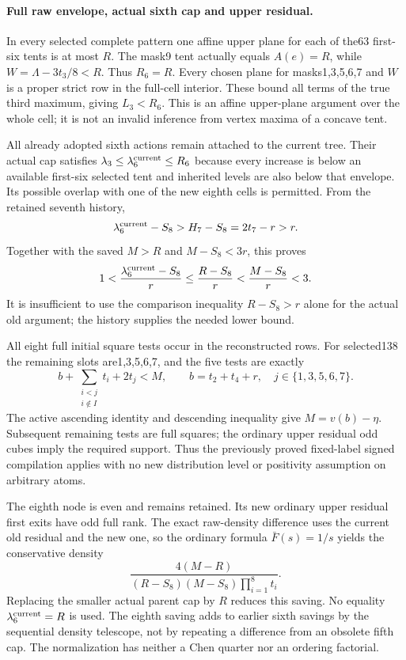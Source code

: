 \paragraph{Full raw envelope, actual sixth cap and upper residual.}
In every selected complete pattern one affine upper plane for each of
the63 first-six tents is at most $R$. The mask9 tent actually equals
$A(e)=R$, while $W=\Lambda-3t_3/8<R$. Thus $R_6=R$.
Every chosen plane for masks1,3,5,6,7 and $W$ is a proper strict row
in the full-cell interior. These bound all terms of the true third
maximum, giving $L_3<R_6$. This is an affine upper-plane argument
over the whole cell; it is not an invalid inference from vertex maxima
of a concave tent.

All already adopted sixth actions remain attached to the current
tree. Their actual cap satisfies
$\lambda_3\le\lambda_6^{\rm current}\le R_6$ because every increase
is below an available first-six selected tent and inherited levels
are also below that envelope. Its possible overlap with one of the
new eighth cells is permitted. From the retained seventh history,
\[
 \lambda_6^{\rm current}-S_8>H_7-S_8=2t_7-r>r.
\]
Together with the saved $M>R$ and $M-S_8<3r$, this proves
\[
 1<\frac{\lambda_6^{\rm current}-S_8}{r}
 \le\frac{R-S_8}{r}<\frac{M-S_8}{r}<3.
\]
It is insufficient to use the comparison inequality $R-S_8>r$
alone for the actual old argument; the history supplies the needed
lower bound.

All eight full initial square tests occur in the reconstructed rows.
For selected138 the remaining slots are1,3,5,6,7, and the five tests
are exactly
\[
 b+\sum_{\substack{i<j\\i\notin I}}t_i+2t_j<M,
 \qquad b=t_2+t_4+r,\quad j\in\{1,3,5,6,7\}.
\]
The active ascending identity and descending inequality give
$M=v(b)-\eta$. Subsequent remaining tests are full squares; the
ordinary upper residual odd cubes imply the required support. Thus
the previously proved fixed-label signed compilation applies with no
new distribution level or positivity assumption on arbitrary atoms.

The eighth node is even and remains retained. Its new ordinary upper
residual first exits have odd full rank. The exact raw-density difference
uses the current old residual and the new one, so the ordinary formula
$\bar F(s)=1/s$ yields the conservative density
\[
 \frac{4(M-R)}{(R-S_8)(M-S_8)\prod_{i=1}^8t_i}.
\]
Replacing the smaller actual parent cap by $R$ reduces this saving.
No equality $\lambda_6^{\rm current}=R$ is used. The eighth saving
adds to earlier sixth savings by the sequential density telescope,
not by repeating a difference from an obsolete fifth cap. The
normalization has neither a Chen quarter nor an ordering factorial.

